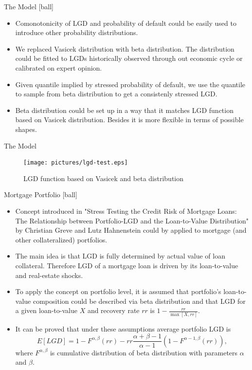 \documentclass{beamer}
\begin{document}
\begin{frame}{The Model}
[ball]
\begin{itemize}
	\item Comonotonicity of LGD and probability of default could be easily used to introduce other probability distributions.
	\item We replaced Vasicek distribution with beta distribution. The distribution could be fitted to LGDs historically observed through out economic cycle
	or calibrated on expert opinion.
	\item Given quantile implied by stressed probability of default, we use the quantile to sample from beta distribution to get a consistenly stressed LGD.
	\item Beta distribution could be set up in a way that it matches LGD function based on Vasicek distribution. Besides it is more flexible in terms of possible shapes.
\end{itemize}
\end{frame}

\begin{frame}{The Model}
\begin{figure}[htp]
\centering
\texttt{[image: pictures/lgd-test.eps]}
\caption{LGD function based on Vasicek and beta distribution}
\label{lgd-test}
\end{figure}
\end{frame}

\begin{frame}{Mortgage Portfolio}
[ball]
\begin{itemize}
	\item Concept introduced in "Stress Testing the Credit Risk of Mortgage Loans:
	The Relationship between Portfolio-LGD and the Loan-to-Value Distribution" by Christian Greve and Lutz Hahnenstein could by applied to mortgage (and other collateralized) portfolios.
	\item The main idea is that LGD is fully determined by actual value of loan collateral. Therefore LGD of a mortgage loan is driven by its loan-to-value and real-estate shocks.
	\item To apply the concept on portfolio level, it is assumed that portfolio's loan-to-value composition could be described via beta distribution
	and that LGD for a given loan-to-value $X$ and recovery rate $rr$ is $1 - \frac{rr}{\max[X, rr]}$.
	\item It can be proved that under these assumptions average portfolio LGD is
		\begin{equation}
			E[LGD] = 1 - F^{\alpha, \beta}(rr) - rr \frac{\alpha + \beta - 1}{\alpha - 1}(1 - F^{\alpha - 1, \beta}(rr)),
		\end{equation}
	where $F^{\alpha, \beta}$ is cumulative distribution of beta distribution with parameters $\alpha$ and $\beta$.
\end{itemize}
\end{frame}
\end{document}
